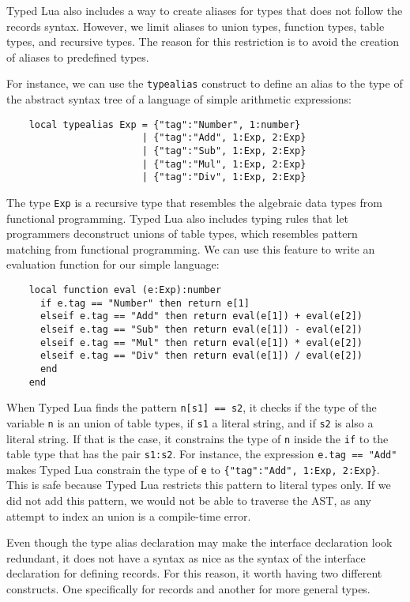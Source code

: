 Typed Lua also includes a way to create aliases for types that does not
follow the records syntax.
However, we limit aliases to union types, function types, table types,
and recursive types.
The reason for this restriction is to avoid the creation of aliases
to predefined types.

For instance, we can use the \texttt{typealias} construct to define an
alias to the type of the abstract syntax tree of a language of simple
arithmetic expressions:
\begin{verbatim}
    local typealias Exp = {"tag":"Number", 1:number}
                        | {"tag":"Add", 1:Exp, 2:Exp}
                        | {"tag":"Sub", 1:Exp, 2:Exp}
                        | {"tag":"Mul", 1:Exp, 2:Exp}
                        | {"tag":"Div", 1:Exp, 2:Exp}
\end{verbatim}

The type \texttt{Exp} is a recursive type that resembles the
algebraic data types from functional programming.
Typed Lua also includes typing rules that let programmers
deconstruct unions of table types, which resembles
pattern matching from functional programming.
We can use this feature to write an evaluation function for
our simple language:
\begin{verbatim}
    local function eval (e:Exp):number
      if e.tag == "Number" then return e[1]
      elseif e.tag == "Add" then return eval(e[1]) + eval(e[2])
      elseif e.tag == "Sub" then return eval(e[1]) - eval(e[2])
      elseif e.tag == "Mul" then return eval(e[1]) * eval(e[2])
      elseif e.tag == "Div" then return eval(e[1]) / eval(e[2])
      end
    end
\end{verbatim}

When Typed Lua finds the pattern \texttt{n[s1] == s2}, it checks
if the type of the variable \texttt{n} is an union of table types,
if \texttt{s1} a literal string, and if \texttt{s2} is also a literal string.
If that is the case, it constrains the type of \texttt{n} inside
the \texttt{if} to the table type that has the pair \texttt{s1:s2}.
For instance, the expression \texttt{e.tag == "Add"} makes Typed Lua
constrain the type of \texttt{e} to \texttt{\{"tag":"Add", 1:Exp, 2:Exp\}}.
This is safe because Typed Lua restricts this pattern to literal types only.
If we did not add this pattern, we would not be able to traverse the AST,
as any attempt to index an union is a compile-time error.

Even though the type alias declaration may make the interface declaration
look redundant, it does not have a syntax as nice as the syntax
of the interface declaration for defining records.
For this reason, it worth having two different constructs.
One specifically for records and another for more general types.

